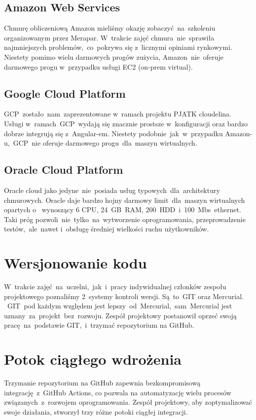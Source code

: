 \subsection{Amazon Web Services}\label{subsec:amazon-web-services}
Chmurę obliczeniową Amazon mieliśmy okazję zobaczyć~na~szkoleniu organizowanym przez Merapar.
W~trakcie zajęć chmura~nie~sprawiła najmniejszych problemów,~co~pokrywa się z~licznymi opiniami rynkowymi.
Niestety pomimo wielu darmowych progów zużycia, Amazon~nie~oferuje darmowego progu w~przypadku usługi EC2 (\gls{on-prem} virtual).

\subsection{Google Cloud Platform}\label{subsec:google-cloud-platform}
GCP~zostało~nam~zaprezentowane w~ramach projektu PJATK cloudelina.
Usługi w~ramach~GCP~wydają się znacznie prostsze w~konfiguracji oraz bardzo dobrze integrują się z~Angular-em.
Niestety podobnie~jak~w~przypadku Amazon-u,~GCP~nie oferuje darmowego progu~dla~maszyn wirtualnych.

\subsection{Oracle Cloud Platform}\label{subsec:oracle-cloud-platform}
Oracle cloud jako jedyne~nie~posiada usług typowych~dla~architektury chmurowych.
Oracle daje bardzo hojny darmowy limit~dla~maszyn wirtualnych opartych o~ wynoszący 6 CPU, 24~GB~RAM, 200~HDD~i~100~Mbs~ethernet.
Taki próg pozwoli~nie~tylko~na~wytworzenie oprogramowania, przeprowadzenie testów,~ale~nawet i~obsługę średniej wielkości ruchu użytkowników.

\section{Wersjonowanie kodu}
\label{sec:wersjonowanie-kodu}

W~trakcie zajęć~na~uczelni,~jak~i~pracy indywidualnej członków zespołu projektowego poznaliśmy 2~systemy kontroli wersji.
Są~to~GIT oraz Mercurial.
~GIT~pod każdym względem jest lepszy~od~Mercurial,~sam~Mercurial jest uznany~za~projekt~bez~rozwoju.
Zespół projektowy postanowił oprzeć swoją pracę~na~podstawie GIT,~i~trzymać repozytorium na GitHub.

\section{Potok ciągłego wdrożenia}
\label{sec:github-actions}
Trzymanie repozytorium na GitHub zapewnia bezkompromisową integrację~z~GitHub Actions, co pozwala na automatyzację wielu procesów związanych~z~rozwojem oprogramowania.
Zespół projektowy, aby zoptymalizować swoje działania, stworzył trzy różne potoki ciągłej integracji.

